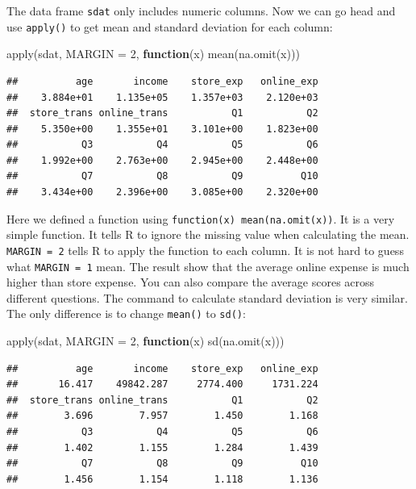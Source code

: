 \documentclass[
  12pt,
]{krantz}
\makeatletter
\newenvironment{Shaded}{\begin{snugshade}}{\end{snugshade}}
\newcommand{\AttributeTok}[1]{\textcolor[rgb]{0.61,0.61,0.61}{#1}}
\newcommand{\ControlFlowTok}[1]{\textcolor[rgb]{0.27,0.27,0.27}{\textbf{#1}}}
\newcommand{\DecValTok}[1]{\textcolor[rgb]{0.06,0.06,0.06}{#1}}
\newcommand{\FunctionTok}[1]{\textcolor[rgb]{0,0,0}{#1}}
\newcommand{\NormalTok}[1]{#1}
\newenvironment{kframe}{%
\medskip{}
\setlength{\fboxsep}{.8em}
 \def\at@end@of@kframe{}%
 \ifinner\ifhmode%
  \def\at@end@of@kframe{\end{minipage}}%
  \begin{minipage}{\columnwidth}%
 \fi\fi%
 \def\FrameCommand##1{\hskip\@totalleftmargin \hskip-\fboxsep
 \colorbox{shadecolor}{##1}\hskip-\fboxsep
     \hskip-\linewidth \hskip-\@totalleftmargin \hskip\columnwidth}%
 \MakeFramed {\advance\hsize-\width
   \@totalleftmargin\z@ \linewidth\hsize
   \@setminipage}}%
 {\par\unskip\endMakeFramed%
 \at@end@of@kframe}
\renewenvironment{Shaded}{\begin{kframe}}{\end{kframe}}
\makeatother
\begin{document}
The data frame \texttt{sdat} only includes numeric columns. Now we can go head and use \texttt{apply()} to get mean and standard deviation for each column:

\begin{Shaded}
\begin{Highlighting}[]
\FunctionTok{apply}\NormalTok{(sdat, }\AttributeTok{MARGIN =} \DecValTok{2}\NormalTok{, }\ControlFlowTok{function}\NormalTok{(x) }\FunctionTok{mean}\NormalTok{(}\FunctionTok{na.omit}\NormalTok{(x)))}
\end{Highlighting}
\end{Shaded}

\begin{verbatim}
##          age       income    store_exp   online_exp 
##    3.884e+01    1.135e+05    1.357e+03    2.120e+03 
##  store_trans online_trans           Q1           Q2 
##    5.350e+00    1.355e+01    3.101e+00    1.823e+00 
##           Q3           Q4           Q5           Q6 
##    1.992e+00    2.763e+00    2.945e+00    2.448e+00 
##           Q7           Q8           Q9          Q10 
##    3.434e+00    2.396e+00    3.085e+00    2.320e+00
\end{verbatim}

Here we defined a function using \texttt{function(x)\ mean(na.omit(x))}. It is a very simple function. It tells R to ignore the missing value when calculating the mean. \texttt{MARGIN\ =\ 2} tells R to apply the function to each column. It is not hard to guess what \texttt{MARGIN\ =\ 1} mean. The result show that the average online expense is much higher than store expense. You can also compare the average scores across different questions. The command to calculate standard deviation is very similar. The only difference is to change \texttt{mean()} to \texttt{sd()}:

\begin{Shaded}
\begin{Highlighting}[]
\FunctionTok{apply}\NormalTok{(sdat, }\AttributeTok{MARGIN =} \DecValTok{2}\NormalTok{, }\ControlFlowTok{function}\NormalTok{(x) }\FunctionTok{sd}\NormalTok{(}\FunctionTok{na.omit}\NormalTok{(x)))}
\end{Highlighting}
\end{Shaded}

\begin{verbatim}
##          age       income    store_exp   online_exp 
##       16.417    49842.287     2774.400     1731.224 
##  store_trans online_trans           Q1           Q2 
##        3.696        7.957        1.450        1.168 
##           Q3           Q4           Q5           Q6 
##        1.402        1.155        1.284        1.439 
##           Q7           Q8           Q9          Q10 
##        1.456        1.154        1.118        1.136
\end{verbatim}
\end{document}
